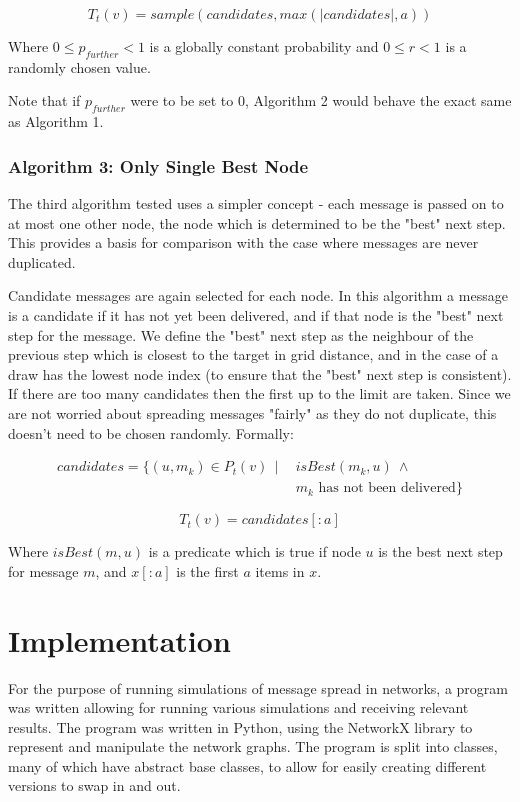 \documentclass[bsc,frontabs,twoside,singlespacing,parskip,deptreport]{infthesis}     %
\begin{document}
\begin{equation}
T_{t}(v) = sample(candidates, max(|candidates|, a))
\end{equation}

Where $0 \leq p_{further} < 1$ is a globally constant probability and $0 \leq r < 1$ is a randomly chosen value.

Note that if $p_{further}$ were to be set to 0, Algorithm 2 would behave the exact same as Algorithm 1.

\subsection{Algorithm 3: Only Single Best Node}
The third algorithm tested uses a simpler concept - each message is passed on to at most one other node, the node which is determined to be the "best" next step. This provides a basis for comparison with the case where messages are never duplicated.

Candidate messages are again selected for each node. In this algorithm a message is a candidate if it has not yet been delivered, and if that node is the "best" next step for the message. We define the "best" next step as the neighbour of the previous step which is closest to the target in grid distance, and in the case of a draw has the lowest node index (to ensure that the "best" next step is consistent). If there are too many candidates then the first up to the limit are taken. Since we are not worried about spreading messages "fairly" as they do not duplicate, this doesn't need to be chosen randomly. Formally:

\begin{equation}
\begin{split}
candidates = \{ (u, m_{k}) \in P_{t}(v) \:\: | \:\: & isBest(m_{k}, u) \: \wedge \\
& m_{k} \mbox{ has not been delivered} \}
\end{split}
\end{equation}

\begin{equation}
T_{t}(v) = candidates[:a]
\end{equation}

Where $isBest(m, u)$ is a predicate which is true if node $u$ is the best next step for message $m$, and $x[:a]$ is the first $a$ items in $x$.


\chapter{Implementation}
For the purpose of running simulations of message spread in networks, a program was written allowing for running various simulations and receiving relevant results. The program was written in Python, using the NetworkX library\cite{NetworkX} to represent and manipulate the network graphs. The program is split into classes, many of which have abstract base classes, to allow for easily creating different versions to swap in and out.
\end{document}
